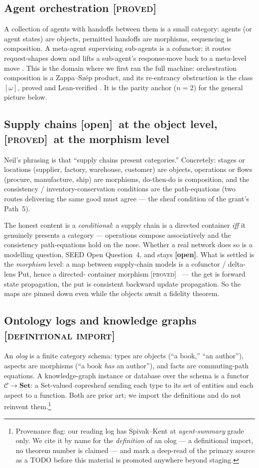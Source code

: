 \documentclass[11pt]{article}
\theoremstyle{definition}
\newcommand{\C}{\mathcal{C}}
\newcommand{\Set}{\mathbf{Set}}
\newcommand{\gProved}{\textsc{[proved]}}
\newcommand{\gImport}{\textsc{[definitional import]}}
\newcommand{\gOpen}{\textbf{[open]}}
\begin{document}
\subsection{Agent orchestration \gProved}
A collection of agents with handoffs between them is a small category: agents (or agent
states) are objects, permitted handoffs are morphisms, sequencing is composition. A
meta-agent supervising sub-agents is a cofunctor: it routes request-shapes down and lifts a
sub-agent's response-move back to a meta-level move \cite{clarke-lenses}. This is the domain
where we first ran the full machine: orchestration composition is a Zappa--Sz\'ep product,
and its re-entrancy obstruction is the class $[\omega]$, proved and Lean-verified
\cite{orch}. It is the parity anchor ($n=2$) for the general picture below.

\subsection{Supply chains \gOpen\ at the object level, \gProved\ at the morphism level}
Neil's phrasing is that ``supply chains present categories.'' Concretely: stages or
locations (supplier, factory, warehouse, customer) are objects, operations or flows
(procure, manufacture, ship) are morphisms, do-then-do is composition, and the
consistency / inventory-conservation conditions are the path-equations (two routes
delivering the same good must agree --- the sheaf condition of the grant's Path~5).

The honest content is a \emph{conditional}: a supply chain is a directed container
\emph{iff} it genuinely presents a category --- operations compose associatively and the
consistency path-equations hold on the nose. Whether a real network does so is a modelling
question, SEED Open Question~4, and stays \gOpen. What is settled is the \emph{morphism}
level: a map between supply-chain models is a cofunctor / delta-lens Put, hence a directed-
container morphism \gProved\ \cite{coflens} --- the get is forward state propagation,
the put is consistent backward update propagation. So the maps are pinned down even while
the objects await a fidelity theorem.

\subsection{Ontology logs and knowledge graphs \gImport}
An \emph{olog} \cite{spivak-ologs} is a finite category schema: types are objects (``a
book,'' ``an author''), aspects are morphisms (``a book \emph{has} an author''), and facts
are commuting-path equations. A knowledge-graph instance or database over the schema is a
functor $\C\to\Set$: a Set-valued copresheaf sending each type to its set of entities and
each aspect to a function. Both are prior art; we import the definitions and do not reinvent
them.\footnote{Provenance flag: our reading log has Spivak--Kent \cite{spivak-ologs} at
\emph{agent-summary} grade only. We cite it by name for the \emph{definition} of an olog ---
a definitional import, no theorem number is claimed --- and mark a deep-read of the primary
source as a TODO before this material is promoted anywhere beyond staging.}
\end{document}
